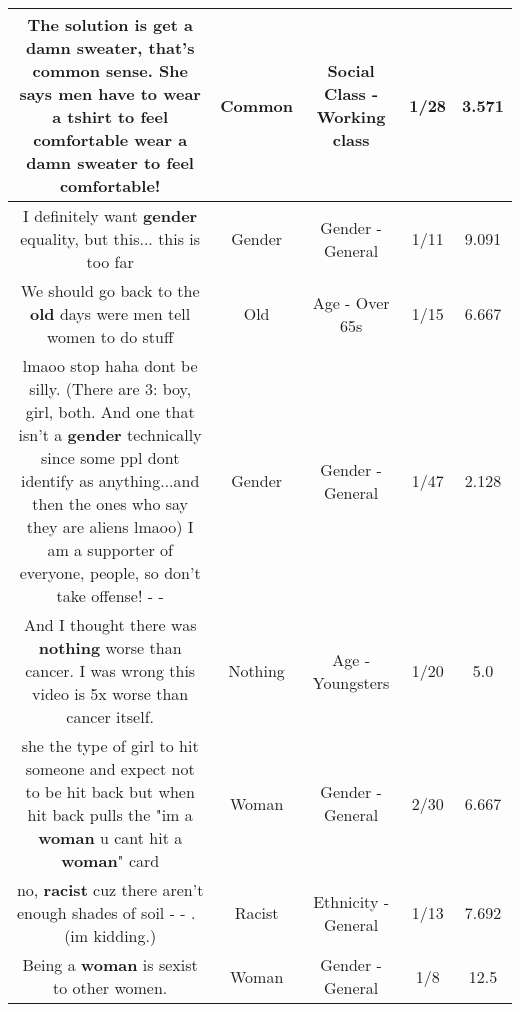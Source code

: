 \documentclass[11pt]{article}
\newlength\mylength
\begin{document}
\begin{center}
\begin{longtable}{|C{.65\mylength}|C{.30\mylength}|C{.12\mylength}|C{.12\mylength}|C{.12\mylength}|}
  \small The solution is get a damn sweater, that's \textbf{common} sense. She says men have to wear a tshirt to feel comfortable wear a damn sweater to feel comfortable!\normalsize   & Common & Social Class - Working class & 1/28 & 3.571 \\  \hline
  \small I definitely want \textbf{gender} equality, but this... this is too far\normalsize   & Gender & Gender - General & 1/11 & 9.091 \\  \hline
  \small We should go back to the \textbf{old} days were men tell women to do stuff\normalsize   & Old & Age - Over 65s & 1/15 & 6.667 \\  \hline
  \small lmaoo stop haha dont be silly. (There are 3: boy, girl, both. And one that isn't a \textbf{gender} technically since some ppl dont identify as anything...and then the ones who say they are aliens lmaoo)   I am a supporter of everyone, people, so don't take offense! - -\normalsize   & Gender & Gender - General & 1/47 & 2.128 \\  \hline
  \small And I thought there was \textbf{nothing} worse than cancer. I was wrong this video is 5x worse than cancer itself.\normalsize   & Nothing & Age - Youngsters & 1/20 & 5.0 \\  \hline
  \small she the type of girl to hit someone and expect not to be hit back but when hit back pulls the "im a \textbf{woman} u cant hit a \textbf{woman}" card\normalsize   & Woman & Gender - General & 2/30 & 6.667 \\  \hline
  \small no, \textbf{racist} cuz there aren't enough shades of soil - - .  (im kidding.)\normalsize   & Racist & Ethnicity - General & 1/13 & 7.692 \\  \hline
  \small Being a \textbf{woman} is sexist to other women.\normalsize   & Woman & Gender - General & 1/8 & 12.5 \\  \hline

\end{longtable}
\end{center}
\end{document}
